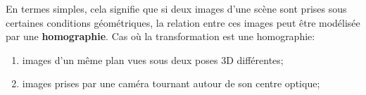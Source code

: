 \documentclass[../CSC_5RO17_TA_TP1.tex]{subfiles}
\begin{document}
\noindent En termes simples, cela signifie que si deux images d'une scène sont prises sous certaines conditions géométriques, la relation entre ces images peut être modélisée par une \textbf{homographie}. Cas où la transformation est une homographie:
\begin{enumerate}[noitemsep, rightmargin=\leftmargin]
    \item images d'un même plan vues sous deux poses 3D différentes;
    \item images prises par une caméra tournant autour de son centre optique;
\end{enumerate}
\end{document}
